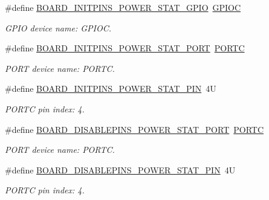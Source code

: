 \begin{DoxyCompactItemize}
\item 
\mbox{\label{group__pin__mux_ga007ddacf2b697c747453b4de32e639ce}} 
\#define \mbox{\hyperlink{group__pin__mux_ga007ddacf2b697c747453b4de32e639ce}{B\+O\+A\+R\+D\+\_\+\+I\+N\+I\+T\+P\+I\+N\+S\+\_\+\+P\+O\+W\+E\+R\+\_\+\+S\+T\+A\+T\+\_\+\+G\+P\+IO}}~\mbox{\hyperlink{group___g_p_i_o___peripheral___access___layer_ga2dca03332d620196ba943bc2346eaa08}{G\+P\+I\+OC}}
\begin{DoxyCompactList}\small\item\em G\+P\+IO device name\+: G\+P\+I\+OC. \end{DoxyCompactList}\item 
\mbox{\label{group__pin__mux_ga13c890578eac55359893483b6894c18d}} 
\#define \mbox{\hyperlink{group__pin__mux_ga13c890578eac55359893483b6894c18d}{B\+O\+A\+R\+D\+\_\+\+I\+N\+I\+T\+P\+I\+N\+S\+\_\+\+P\+O\+W\+E\+R\+\_\+\+S\+T\+A\+T\+\_\+\+P\+O\+RT}}~\mbox{\hyperlink{group___p_o_r_t___peripheral___access___layer_ga68fea88642279a70246e026e7221b0a5}{P\+O\+R\+TC}}
\begin{DoxyCompactList}\small\item\em P\+O\+RT device name\+: P\+O\+R\+TC. \end{DoxyCompactList}\item 
\mbox{\label{group__pin__mux_ga7051894964869d27de3d38839ae1b765}} 
\#define \mbox{\hyperlink{group__pin__mux_ga7051894964869d27de3d38839ae1b765}{B\+O\+A\+R\+D\+\_\+\+I\+N\+I\+T\+P\+I\+N\+S\+\_\+\+P\+O\+W\+E\+R\+\_\+\+S\+T\+A\+T\+\_\+\+P\+IN}}~4U
\begin{DoxyCompactList}\small\item\em P\+O\+R\+TC pin index\+: 4. \end{DoxyCompactList}\item 
\mbox{\label{group__pin__mux_ga49f088d9181bf90858b7451445a6c42b}} 
\#define \mbox{\hyperlink{group__pin__mux_ga49f088d9181bf90858b7451445a6c42b}{B\+O\+A\+R\+D\+\_\+\+D\+I\+S\+A\+B\+L\+E\+P\+I\+N\+S\+\_\+\+P\+O\+W\+E\+R\+\_\+\+S\+T\+A\+T\+\_\+\+P\+O\+RT}}~\mbox{\hyperlink{group___p_o_r_t___peripheral___access___layer_ga68fea88642279a70246e026e7221b0a5}{P\+O\+R\+TC}}
\begin{DoxyCompactList}\small\item\em P\+O\+RT device name\+: P\+O\+R\+TC. \end{DoxyCompactList}\item 
\mbox{\label{group__pin__mux_ga3374e4c8de8af5abc0769e170dac25aa}} 
\#define \mbox{\hyperlink{group__pin__mux_ga3374e4c8de8af5abc0769e170dac25aa}{B\+O\+A\+R\+D\+\_\+\+D\+I\+S\+A\+B\+L\+E\+P\+I\+N\+S\+\_\+\+P\+O\+W\+E\+R\+\_\+\+S\+T\+A\+T\+\_\+\+P\+IN}}~4U
\begin{DoxyCompactList}\small\item\em P\+O\+R\+TC pin index\+: 4. \end{DoxyCompactList}\end{DoxyCompactItemize}


